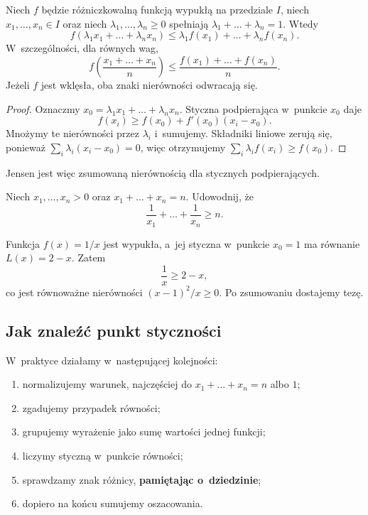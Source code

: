 \documentclass{lecture-kuznia}
\begin{document}
\begin{theorem}
	Niech $f$ będzie różniczkowalną funkcją wypukłą na przedziale $I$, niech
	$x_1,\dots,x_n\in I$ oraz niech $\lambda_1,\dots,\lambda_n\geqslant0$
	spełniają $\lambda_1+\dots+\lambda_n=1$. Wtedy
	\[
		f\left(\lambda_1x_1+\dots+\lambda_nx_n\right)
		\leqslant
		\lambda_1f(x_1)+\dots+\lambda_nf(x_n).
	\]
	W~szczególności, dla równych wag,
	\[
		f\left(\frac{x_1+\dots+x_n}{n}\right)
		\leqslant\frac{f(x_1)+\dots+f(x_n)}{n}.
	\]
	Jeżeli $f$ jest wklęsła, oba znaki nierówności odwracają się.
\end{theorem}
\begin{proof}
	Oznaczmy $x_0=\lambda_1x_1+\dots+\lambda_nx_n$. Styczna podpierająca
	w~punkcie $x_0$ daje
	\[
		f(x_i)\geqslant f(x_0)+f'(x_0)(x_i-x_0).
	\]
	Mnożymy te nierówności przez $\lambda_i$ i~sumujemy. Składniki liniowe
	zerują się, ponieważ $\sum_i\lambda_i(x_i-x_0)=0$, więc otrzymujemy
	$\sum_i\lambda_if(x_i)\geqslant f(x_0)$.
\end{proof}

Jensen jest więc zsumowaną nierównością dla stycznych podpierających.

\begin{example}\label{E1}
	Niech $x_1,\dots,x_n>0$ oraz $x_1+\dots+x_n=n$. Udowodnij, że
	\[
		\frac1{x_1}+\dots+\frac1{x_n}\geqslant n.
	\]
\end{example}
\begin{solution*}[\ref{E1}]
	Funkcja $f(x)=1/x$ jest wypukła, a~jej styczna w~punkcie $x_0=1$ ma
	równanie $L(x)=2-x$. Zatem
	\[
		\frac1x\geqslant2-x,
	\]
	co jest równoważne nierówności $(x-1)^2/x\geqslant0$. Po zsumowaniu
	dostajemy tezę.
\end{solution*}

\subsection{Jak znaleźć punkt styczności}

W~praktyce działamy w~następującej kolejności:
\begin{enumerate}
	\item normalizujemy warunek, najczęściej do $x_1+\dots+x_n=n$ albo $1$;
	\item zgadujemy przypadek równości;
	\item grupujemy wyrażenie jako sumę wartości jednej funkcji;
	\item liczymy styczną w~punkcie równości;
	\item sprawdzamy znak różnicy, \textbf{pamiętając o~dziedzinie};
	\item dopiero na końcu sumujemy oszacowania.
\end{enumerate}
\end{document}
